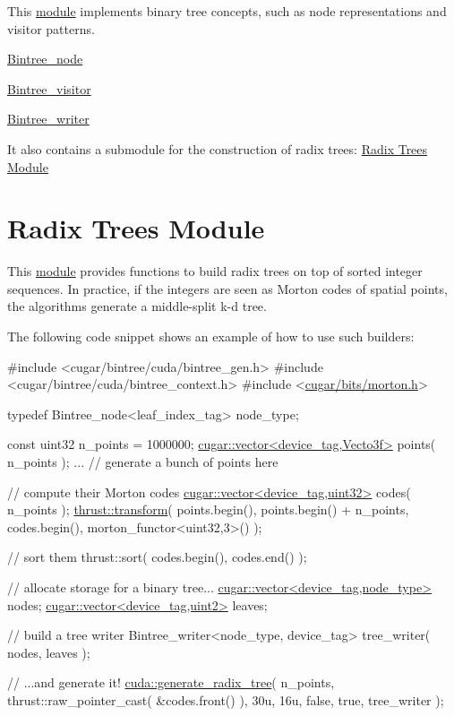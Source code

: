 This \hyperlink{group__bintree}{module} implements binary tree concepts, such as node representations and visitor patterns.


\begin{DoxyItemize}
\item \hyperlink{structcugar_1_1_bintree__node}{Bintree\+\_\+node}
\item \hyperlink{structcugar_1_1_bintree__visitor}{Bintree\+\_\+visitor}
\item \hyperlink{structcugar_1_1_bintree__writer}{Bintree\+\_\+writer}
\end{DoxyItemize}

It also contains a submodule for the construction of radix trees\+: \hyperlink{radixtree_page}{Radix Trees Module} \hypertarget{radixtree_page}{}\section{Radix Trees Module}\label{radixtree_page}
This \hyperlink{group__radixtree}{module} provides functions to build radix trees on top of sorted integer sequences. In practice, if the integers are seen as Morton codes of spatial points, the algorithms generate a middle-\/split k-\/d tree.

The following code snippet shows an example of how to use such builders\+:


\begin{DoxyCode}
\textcolor{preprocessor}{#include <cugar/bintree/cuda/bintree\_gen.h>}
\textcolor{preprocessor}{#include <cugar/bintree/cuda/bintree\_context.h>}
\textcolor{preprocessor}{#include <\hyperlink{morton_8h}{cugar/bits/morton.h}>}

\textcolor{keyword}{typedef} Bintree\_node<leaf\_index\_tag> node\_type;

\textcolor{keyword}{const} uint32 n\_points = 1000000;
\hyperlink{structcugar_1_1vector}{cugar::vector<device\_tag,Vecto3f>} points( n\_points );
... \textcolor{comment}{// generate a bunch of points here}

\textcolor{comment}{// compute their Morton codes}
\hyperlink{structcugar_1_1vector}{cugar::vector<device\_tag,uint32>} codes( n\_points );
\hyperlink{group___primitives_gab584ee91ed39f9b1fec5aa0e7a0284a4}{thrust::transform}(
    points.begin(),
    points.begin() + n\_points,
    codes.begin(),
    morton\_functor<uint32,3>() );

\textcolor{comment}{// sort them}
thrust::sort( codes.begin(), codes.end() );

\textcolor{comment}{// allocate storage for a binary tree...}
\hyperlink{structcugar_1_1vector}{cugar::vector<device\_tag,node\_type>} nodes;
\hyperlink{structcugar_1_1vector}{cugar::vector<device\_tag,uint2>}     leaves;

\textcolor{comment}{// build a tree writer}
Bintree\_writer<node\_type, device\_tag> tree\_writer( nodes, leaves );

\textcolor{comment}{// ...and generate it!}
\hyperlink{group__radixtree_gafb888a81f085548c89a282181d74649a}{cuda::generate\_radix\_tree}(
    n\_points,
    thrust::raw\_pointer\_cast( &codes.front() ),
    30u,
    16u,
    \textcolor{keyword}{false},
    \textcolor{keyword}{true},
    tree\_writer );
\end{DoxyCode}
 